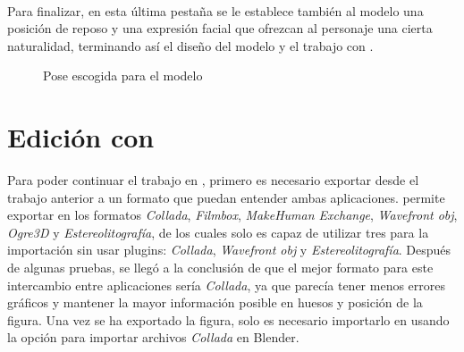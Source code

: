 \documentclass{subfiles}
\begin{document}
    \paragraph{}
    Para finalizar, en esta última pestaña se le establece también al modelo una posición de reposo y una expresión facial que ofrezcan al personaje una cierta naturalidad, terminando así el diseño del modelo y el trabajo con \makehuman.
    
    \begin{figure}[H]
    \centering
    \caption{Pose escogida para el modelo}
    \label{fig:4.1.model_pose}
    \end{figure}
    
    \section{Edición con \blender}
    \label{sec:edicion_con_blender}

    Para poder continuar el trabajo en \blender, primero es necesario exportar desde \makehuman el trabajo anterior a un formato que puedan entender ambas aplicaciones. \makehuman permite exportar en los formatos \textit{Collada}, \textit{Filmbox}, \textit{MakeHuman Exchange}, \textit{Wavefront obj}, \textit{Ogre3D} y \textit{Estereolitografía}, de los cuales \blender solo es capaz de utilizar tres para la importación sin usar plugins: \textit{Collada}, \textit{Wavefront obj} y \textit{Estereolitografía}. Después de algunas pruebas, se llegó a la conclusión de que el mejor formato para este intercambio entre aplicaciones sería \textit{Collada}, ya que parecía tener menos errores gráficos y mantener la mayor información posible en huesos y posición de la figura. Una vez se ha exportado la figura, solo es necesario importarlo en \blender usando la opción para importar archivos \textit{Collada} en Blender.
\end{document}

